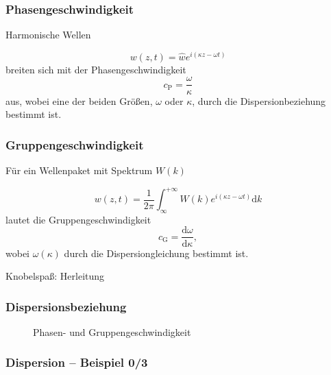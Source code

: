\documentclass[hyperref={pdfpagemode=FullScreen, colorlinks=false}]{beamer}
\begin{document}
\begin{frame}
\frametitle{Phasengeschwindigkeit}
Harmonische Wellen \hfill

 \begin{equation*}
  w(z,t)=\hat{w} e^{i(\kappa z-\omega t)}
 \end{equation*}
 breiten sich mit der Phasengeschwindigkeit
 \begin{equation*}
  c_\mathrm{P}=\frac{\omega}{\kappa}
 \end{equation*}
 aus, 
wobei eine der beiden Größen, $\omega$ oder $\kappa$, durch die Dispersionbeziehung bestimmt ist.
\end{frame}


\begin{frame}
\frametitle{Gruppengeschwindigkeit}
Für ein Wellenpaket mit Spektrum $W(k)$ \hfill

\begin{equation*}
  w(z,t)=\frac{1}{2\pi}\int_\infty^{+\infty} W(k)e^{i(\kappa z-\omega t)}\mathrm{d}k
 \end{equation*}
 lautet die Gruppengeschwindigkeit
 \begin{equation*}
  c_\mathrm{G}=\frac{\mathrm{d}\omega}{\mathrm{d}\kappa},
 \end{equation*}
wobei $\omega(\kappa)$ durch die Dispersiongleichung bestimmt ist.

\vfill
Knobelspaß: Herleitung 
\end{frame}


\begin{frame}
\frametitle{Dispersionsbeziehung}
\begin{figure}

\caption*{Phasen- und Gruppengeschwindigkeit}
\end{figure}
\end{frame}


\begin{frame}
\frametitle{Dispersion -- Beispiel 0/3} 

\end{frame}
\end{document}
